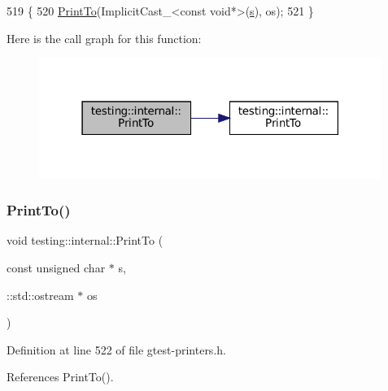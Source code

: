 \begin{DoxyCode}
519                                                     \{
520   \hyperlink{namespacetesting_1_1internal_af2c33928facbf2edf7af564278724d98}{PrintTo}(ImplicitCast\_<const void*>(\hyperlink{namespaceservice__node__3_aa976421a49e0b54f23833423400849ae}{s}), os);
521 \}
\end{DoxyCode}
Here is the call graph for this function\+:
\nopagebreak
\begin{figure}[H]
\begin{center}
\leavevmode
\includegraphics[width=316pt]{namespacetesting_1_1internal_a1320096b116f8cc4b688acbd5b783051_cgraph}
\end{center}
\end{figure}
\mbox{\label{namespacetesting_1_1internal_a42c591f2164ad105b502a9262333aed2}} 
\subsubsection{\texorpdfstring{Print\+To()}{PrintTo()}\hspace{0.1cm}{\footnotesize\ttfamily [14/20]}}
{\footnotesize\ttfamily void testing\+::internal\+::\+Print\+To (\begin{DoxyParamCaption}\item[{const unsigned char $\ast$}]{s,  }\item[{\+::std\+::ostream $\ast$}]{os }\end{DoxyParamCaption})\hspace{0.3cm}{\ttfamily [inline]}}



Definition at line 522 of file gtest-\/printers.\+h.



References Print\+To().


